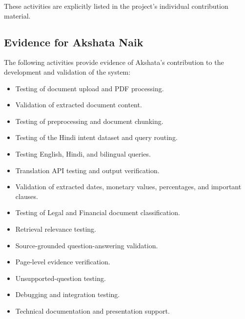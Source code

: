 These activities are explicitly listed in the project's individual
contribution material.

\subsection{Evidence for Akshata Naik}

The following activities provide evidence of Akshata's contribution
to the development and validation of the system:

\begin{itemize}

    \item Testing of document upload and PDF processing.

    \item Validation of extracted document content.

    \item Testing of preprocessing and document chunking.

    \item Testing of the Hindi intent dataset and query routing.

    \item Testing English, Hindi, and bilingual queries.

    \item Translation API testing and output verification.

    \item Validation of extracted dates, monetary values, percentages,
    and important clauses.

    \item Testing of Legal and Financial document classification.

    \item Retrieval relevance testing.

    \item Source-grounded question-answering validation.

    \item Page-level evidence verification.

    \item Unsupported-question testing.

    \item Debugging and integration testing.

    \item Technical documentation and presentation support.

\end{itemize}


